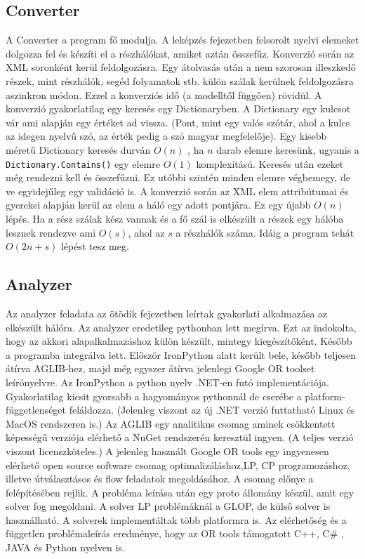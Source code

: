 \subsection{Converter}
A Converter a program fő modulja. A leképzés fejezetben felsorolt nyelvi elemeket dolgozza fel és készíti el a részhálókat, amiket aztán összefűz. Konverzió során az XML soronként kerül feldolgozásra. Egy átolvasás után a nem szorosan illeszkedő részek, mint részhálók, segéd folyamatok stb. külön szálak kerülnek feldolgozásra aszinkron módon. Ezzel a konverziós idő (a modelltől függően) rövidül. A konverzió gyakorlatilag egy keresés egy Dictionaryben. A Dictionary egy kulcsot vár ami alapján egy értéket ad vissza. (Pont, mint egy valós szótár, ahol a kulcs az idegen nyelvű szó, az érték pedig a szó magyar megfelelője). Egy kisebb méretű Dictionary keresés durván $O(n)$ , ha $n$ darab elemre keresünk, ugyanis a \texttt{Dictionary.Contains()} egy elemre $O(1)$ komplexitású. Keresés után ezeket még rendezni kell és összefűzni. Ez utóbbi szintén minden elemre végbemegy, de ve egyidejűleg egy validáció is. A konverzió során az XML elem attribútumai és gyerekei alapján kerül az elem a háló egy adott pontjára. Ez egy újabb $O(n)$ lépés. Ha a rész szálak kész vannak és a fő szál is elkészült a részek egy hálóba lesznek rendezve ami $O(s)$, ahol az $s$ a részhálók száma. Idáig a program tehát $O(2n+s)$ lépést tesz meg. 
\subsection{Analyzer}
Az analyzer feladata az ötödik %
 fejezetben leírtak gyakorlati alkalmazása az elkészült hálóra. Az analyzer eredetileg pythonban lett megírva. Ezt az indokolta, hogy az akkori alapalkalmazáshoz külön készült, mintegy kiegészítőként. Később a programba integrálva lett. Először IronPython alatt került bele, később teljesen átírva AGLIB-hez, majd még egyszer átírva jelenlegi Google OR toolset leírónyelvre. Az IronPython a python nyelv .NET-en futó implementációja. Gyakorlatilag kicsit gyorsabb a hagyományos pythonnál de cserébe a platform-függetlenséget feláldozza. (Jelenleg viszont az új .NET verzió futtatható Linux és MacOS rendszeren is.) Az AGLIB egy analitikus csomag aminek csökkentett képességű verziója elérhető a NuGet rendszerén keresztül ingyen. (A teljes verzió viszont licenszköteles.) A jelenleg használt Google OR tools egy ingyenesen elérhető open source software csomag optimalizáláshoz,LP, CP programozáshoz, illetve útválasztásos és flow feladatok megoldásához. A csomag előnye a felépítésében rejlik. A probléma leírása után egy proto állomány  készül, amit egy solver fog megoldani. A solver LP problémáknál a GLOP, de külső solver is használható. A solverek implementáltak több platformra is. Az elérhetőség és a független problémaleírás eredménye, hogy az OR tools támogatott C++, C\# , JAVA és Python nyelven is.
 
